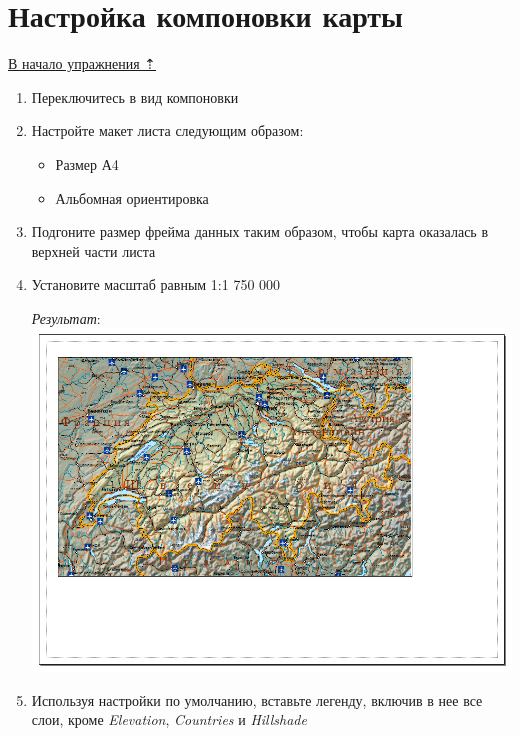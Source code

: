 \documentclass[]{book}
\providecommand{\tightlist}{%
  \setlength{\itemsep}{0pt}\setlength{\parskip}{0pt}}
\theoremstyle{definition}
\theoremstyle{definition}
\theoremstyle{definition}
\theoremstyle{remark}
\begin{document}
\hypertarget{map-design-general-layout}{%
\section{Настройка компоновки карты}\label{map-design-general-layout}}

\protect\hyperlink{map-design-general}{В начало упражнения ⇡}

\begin{enumerate}
\def\labelenumi{\arabic{enumi}.}
\item
  Переключитесь в вид компоновки
\item
  Настройте макет листа следующим образом:

  \begin{itemize}
  \tightlist
  \item
    Размер А4
  \item
    Альбомная ориентировка
  \end{itemize}
\item
  Подгоните размер фрейма данных таким образом, чтобы карта оказалась в
  верхней части листа
\item
  Установите масштаб равным 1:1 750 000

  \emph{Результат}: \includegraphics{images/Ex04/image25.png}
\item
  Используя настройки по умолчанию, вставьте легенду, включив в нее все
  слои, кроме \emph{Elevation}, \emph{Countries} и \emph{Hillshade}


\end{enumerate}
\end{document}
